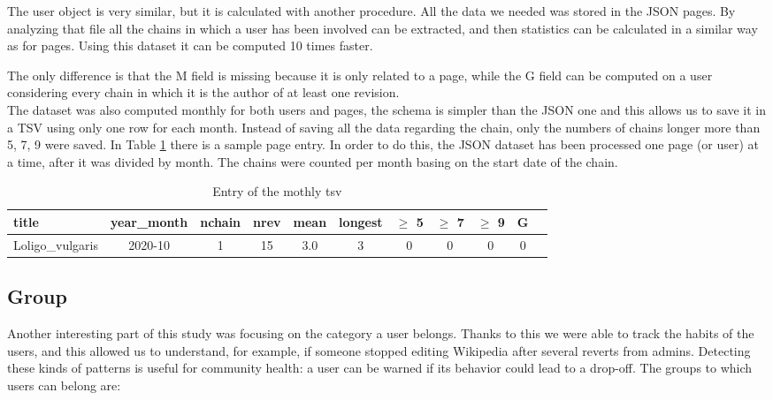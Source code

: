 The user object is very similar, but it is calculated with another procedure. All the data we needed
was stored in the JSON pages. By analyzing that file all the chains in which a user has been
involved can be extracted, and then statistics can be calculated in a similar way as for pages.
Using this dataset it can be computed 10 times faster.  

The only difference is that the M field is missing because it is only related to a page, while the G field
can be computed on a user considering every chain in which it is the author of at least one revision.\\

The dataset was also computed monthly for both users and pages, the schema is simpler than the
JSON one and this allows us to save it in a TSV using only one row for each month. Instead of saving
all the data regarding the chain, only the numbers of chains longer more than 5, 7, 9 were saved. In
Table \ref{table:chainsPagemonth} there is a sample page entry. In order to do this, the JSON
dataset has been processed one page (or user) at a time, after it was divided by month. The chains
were counted per month basing on the start date of the chain.   

\begin{table}[H]
    \centering
    \begin{tabularx}{\columnwidth}{@{}Xcccccccccc@{}}
        \midrule
        \textbf{title} & \textbf{year\_month} & \textbf{nchain} & \textbf{nrev} & \textbf{mean} & \textbf{longest} & \textbf{$\geq$ 5} & \textbf{$\geq$ 7} & \textbf{$\geq$ 9} & \textbf{G}\\ \toprule
        Loligo\_vulgaris & 2020-10 & 1 & 15 & 3.0 & 3 & 0 & 0 & 0 & 0\\
        
        \bottomrule
    \end{tabularx}
    
    \caption{Entry of the mothly tsv \label{table:chainsPagemonth}}
\end{table}


\subsection{Group}
Another interesting part of this study was focusing on the category a user belongs. Thanks to this
we were able to track the habits of the users, and this allowed us to understand, for example, if
someone stopped editing Wikipedia after several reverts from admins. Detecting these kinds of
patterns is useful for community health: a user can be warned if its behavior could lead to a
drop-off. The groups to which users can belong are: 


